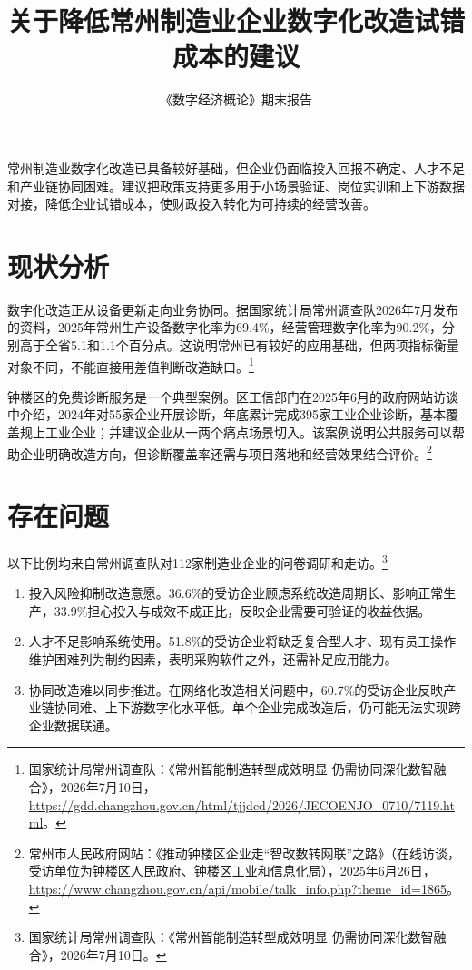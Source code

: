 \documentclass[UTF8,a4paper,12pt]{ctexart}
\title{关于降低常州制造业企业数字化改造试错成本的建议}
\author{《数字经济概论》期末报告}
\date{}
\begin{document}
\maketitle

常州制造业数字化改造已具备较好基础，但企业仍面临投入回报不确定、人才不足和产业链协同困难。建议把政策支持更多用于小场景验证、岗位实训和上下游数据对接，降低企业试错成本，使财政投入转化为可持续的经营改善。

\section{现状分析}
数字化改造正从设备更新走向业务协同。据国家统计局常州调查队2026年7月发布的资料，2025年常州生产设备数字化率为69.4\%，经营管理数字化率为90.2\%，分别高于全省5.1和1.1个百分点。这说明常州已有较好的应用基础，但两项指标衡量对象不同，不能直接用差值判断改造缺口。\footnote{国家统计局常州调查队：《常州智能制造转型成效明显 仍需协同深化数智融合》，2026年7月10日，\url{https://gdd.changzhou.gov.cn/html/tjjdcd/2026/JECOENJO_0710/7119.html}。}

钟楼区的免费诊断服务是一个典型案例。区工信部门在2025年6月的政府网站访谈中介绍，2024年对55家企业开展诊断，年底累计完成395家工业企业诊断，基本覆盖规上工业企业；并建议企业从一两个痛点场景切入。该案例说明公共服务可以帮助企业明确改造方向，但诊断覆盖率还需与项目落地和经营效果结合评价。\footnote{常州市人民政府网站：《推动钟楼区企业走“智改数转网联”之路》（在线访谈，受访单位为钟楼区人民政府、钟楼区工业和信息化局），2025年6月26日，\url{https://www.changzhou.gov.cn/api/mobile/talk_info.php?theme_id=1865}。}

\section{存在问题}
以下比例均来自常州调查队对112家制造业企业的问卷调研和走访。\footnote{国家统计局常州调查队：《常州智能制造转型成效明显 仍需协同深化数智融合》，2026年7月10日。}

\begin{enumerate}[label=\arabic*、,leftmargin=2em]
\item 投入风险抑制改造意愿。36.6\%的受访企业顾虑系统改造周期长、影响正常生产，33.9\%担心投入与成效不成正比，反映企业需要可验证的收益依据。
\item 人才不足影响系统使用。51.8\%的受访企业将缺乏复合型人才、现有员工操作维护困难列为制约因素，表明采购软件之外，还需补足应用能力。
\item 协同改造难以同步推进。在网络化改造相关问题中，60.7\%的受访企业反映产业链协同难、上下游数字化水平低。单个企业完成改造后，仍可能无法实现跨企业数据联通。
\end{enumerate}
\end{document}
